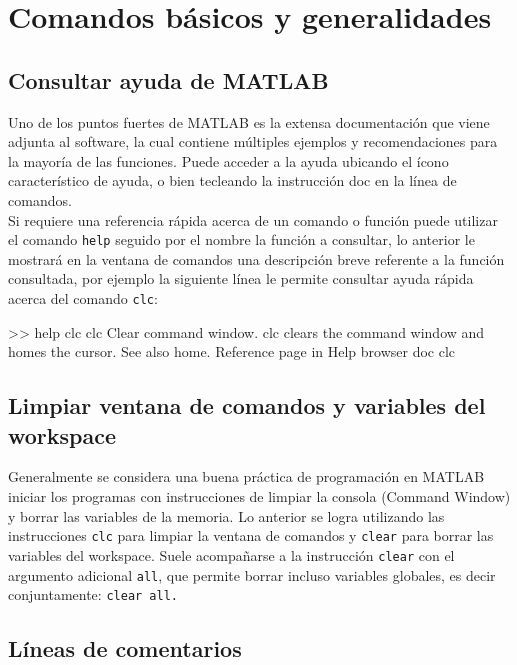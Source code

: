 \section{Comandos básicos y generalidades}

\subsection{Consultar ayuda de MATLAB}

Uno de los puntos fuertes de MATLAB es la extensa documentación que
viene adjunta al software, la cual contiene múltiples ejemplos y
recomendaciones para la mayoría de las funciones. Puede acceder a la
ayuda ubicando el ícono característico de ayuda, o bien tecleando la
instrucción doc en la línea de comandos.\\

Si requiere una referencia rápida acerca de un comando o función puede
utilizar el comando \texttt{help} seguido por el nombre la función a
consultar, lo anterior le mostrará en la ventana de comandos una
descripción breve referente a la función consultada, por ejemplo la
siguiente línea le permite consultar ayuda rápida acerca del comando
\texttt{clc}:

\begin{matlab}
>> help clc
    clc    Clear command window.
    clc clears the command window and homes the cursor.
    See also home.
    Reference page in Help browser
    doc clc
\end{matlab}

\subsection{Limpiar ventana de comandos y variables del workspace}

Generalmente se considera una buena práctica de programación en MATLAB
iniciar los programas con instrucciones de limpiar la consola (Command
Window) y borrar las variables de la memoria. Lo anterior se logra
utilizando las instrucciones \texttt{clc} para limpiar la ventana de
comandos y \texttt{clear} para borrar las variables del workspace. Suele
acompañarse a la instrucción \texttt{clear} con el argumento adicional
\texttt{all}, que permite borrar incluso variables globales, es decir
conjuntamente: \texttt{clear all.}

\subsection{Líneas de comentarios}

